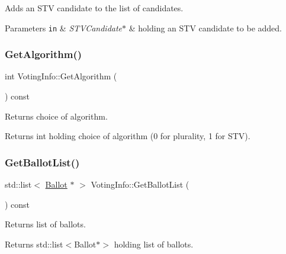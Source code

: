Adds an S\+TV candidate to the list of candidates. 


\begin{DoxyParams}[1]{Parameters}
\mbox{\tt in}  & {\em S\+T\+V\+Candidate$\ast$} & holding an S\+TV candidate to be added. \\
\hline
\end{DoxyParams}
\mbox{\label{classVotingInfo_a2d0abd1d9be36bfd9fb734dfa644b8e1}} 
\subsubsection{\texorpdfstring{Get\+Algorithm()}{GetAlgorithm()}}
{\footnotesize\ttfamily int Voting\+Info\+::\+Get\+Algorithm (\begin{DoxyParamCaption}{ }\end{DoxyParamCaption}) const}



Returns choice of algorithm. 

\begin{DoxyReturn}{Returns}
int holding choice of algorithm (0 for plurality, 1 for S\+TV). 
\end{DoxyReturn}
\mbox{\label{classVotingInfo_a73ac1888c3695a912ef6991b6667eeaf}} 
\subsubsection{\texorpdfstring{Get\+Ballot\+List()}{GetBallotList()}}
{\footnotesize\ttfamily std\+::list$<$ \hyperlink{classBallot}{Ballot} $\ast$ $>$ Voting\+Info\+::\+Get\+Ballot\+List (\begin{DoxyParamCaption}{ }\end{DoxyParamCaption}) const}



Returns list of ballots. 

\begin{DoxyReturn}{Returns}
std\+::list$<$\+Ballot$\ast$$>$ holding list of ballots. 
\end{DoxyReturn}
\mbox{\label{classVotingInfo_ad64e934ebd73e4be9e89458e0a304030}} 
